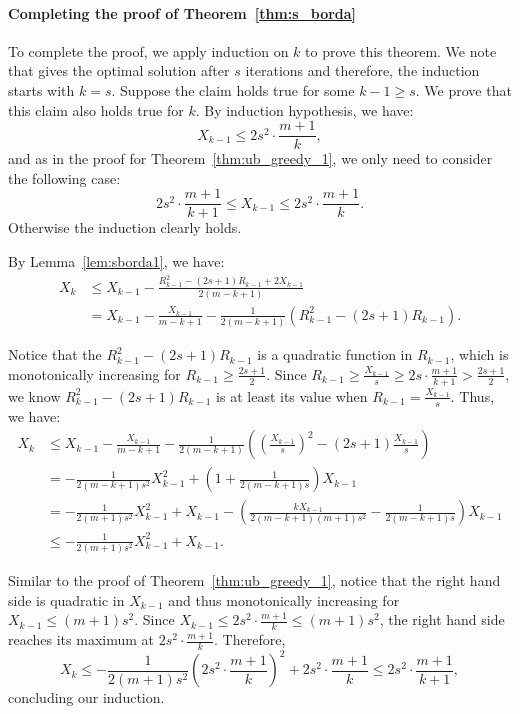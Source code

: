 \paragraph{Completing the proof of Theorem~\ref{thm:s_borda}}
To complete the proof, we apply induction on $k$ to prove this theorem. We note that \g{} gives the optimal solution after $s$ iterations and therefore, the induction starts with $k = s$. Suppose the claim holds true for some $k - 1 \geq s$. We prove that this claim also holds true for $k$. By induction hypothesis, we have:
\[
X_{k - 1} \leq 2s^2\cdot \frac{m + 1}{k},
\]
and as in the proof for Theorem~\ref{thm:ub_greedy_1}, we only need to consider the following case:
\[
2s^2 \cdot \frac{m + 1}{k + 1} \leq X_{k - 1} \leq 2s^2 \cdot \frac{m + 1}{k}.
\]
Otherwise the induction clearly holds.

By Lemma~\ref{lem:sborda1}, we have:
\begin{align*}
X_k &\leq X_{k - 1} - \frac{R_{k - 1}^2 - (2s + 1)R_{k - 1} + 2X_{k - 1}}{2(m - k + 1)}\\ &= X_{k - 1} - \frac{X_{k - 1}}{m - k + 1} - \frac{1}{2(m - k + 1)}(R_{k - 1}^2 - (2s + 1)R_{k - 1}).
\end{align*}

Notice that the $R_{k - 1}^2 - (2s + 1)R_{k - 1}$ is a quadratic function in $R_{k - 1}$, which is monotonically increasing for $R_{k - 1} \geq \frac{2s + 1}{2}$. Since $R_{k - 1} \geq \frac{X_{k - 1}}{s} \geq 2s\cdot \frac{m + 1}{k + 1} > \frac{2s + 1}{2}$, we know $R_{k - 1}^2 - (2s + 1)R_{k - 1}$ is at least its value when $R_{k - 1} = \frac{X_{k - 1}}{s}$. Thus, we have:
\begin{align*}
X_k &\leq X_{k - 1} - \frac{X_{k - 1}}{m - k + 1} - \frac{1}{2(m - k + 1)}\left(\left(\frac{X_{k - 1}}{s}\right)^2 - (2s + 1)\frac{X_{k - 1}}{s}\right) \\
&= -\frac{1}{2(m - k + 1)s^2}X_{k - 1}^2 + \left(1 + \frac{1}{2(m - k + 1)s}\right)X_{k - 1}\\
&=-\frac{1}{2(m + 1)s^2}X_{k - 1}^2 + X_{k - 1} - \left(\frac{kX_{k - 1}}{2(m - k + 1)(m + 1)s^2} - \frac{1}{2(m - k + 1)s}\right)X_{k - 1}\\
&\leq -\frac{1}{2(m + 1)s^2}X_{k - 1}^2 + X_{k - 1}.
\end{align*}

Similar to the proof of Theorem~\ref{thm:ub_greedy_1}, notice that the right hand side is quadratic in $X_{k - 1}$ and thus monotonically increasing for $X_{k - 1} \leq (m + 1)s^2$. Since $X_{k - 1} \leq 2s^2\cdot \frac{m + 1}{k} \leq (m + 1)s^2$, the right hand side reaches its maximum at $2s^2\cdot \frac{m + 1}{k}$. Therefore,
\[
X_k \leq -\frac{1}{2(m + 1)s^2}\left(2s^2\cdot \frac{m + 1}{k}\right)^2 + 2s^2\cdot \frac{m + 1}{k} \leq 2s^2\cdot \frac{m + 1}{k + 1},
\]
concluding our induction.


